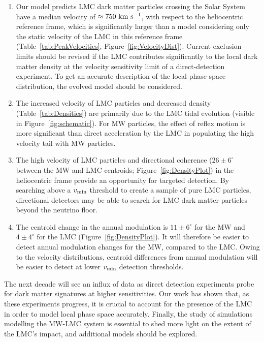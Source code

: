 \documentclass[fleqn,usenatbib]{mnras}
\newcommand{\kms}{{\rm ~km~s^{-1}}}	%
\begin{document}
\begin{enumerate}
    \item Our model predicts LMC dark matter particles crossing the Solar System have a median velocity of $\approx 750 \rm \kms$, with respect to the heliocentric reference frame, which is significantly larger than a model considering only the static velocity of the LMC in this reference frame (Table~\ref{tab:PeakVelocities}, Figure~\ref{fig:VelocityDist}). 
    Current exclusion limits should be revised if the LMC contributes significantly to the local dark matter density at the velocity sensitivity limit of a direct-detection experiment. To get an accurate description of the local phase-space distribution, the evolved model should be considered.
    \item  The increased velocity of LMC particles and decreased density (Table~\ref{tab:Densities}) are primarily due to the LMC tidal evolution (visible in Figure~\ref{fig:schematic}). For MW particles, the effect of reflex motion is more significant than direct acceleration by the LMC in populating the high velocity tail with MW particles. 
    \item The high velocity of LMC particles and directional coherence ($26\pm6 ^\circ$ between the MW and LMC centroids; Figure~\ref{fig:DensityPlot}) in the heliocentric frame provide an opportunity for targeted detection. By searching above a $v_{\rm min}$ threshold to create a sample of pure LMC particles, directional detectors may be able to search for LMC dark matter particles beyond the neutrino floor. 
    \item The centroid change in the annual modulation is $11 \pm 6^{\circ}$ for the MW and $4 \pm 4 ^{\circ}$ for the LMC (Figure~\ref{fig:DensityPlot}). It will therefore be easier to detect annual modulation changes for the MW, compared to the LMC. Owing to the velocity distributions, centroid differences from annual modulation will be easier to detect at lower $v_{\rm min}$ detection thresholds.
\end{enumerate}
The next decade will see an influx of data as direct detection experiments probe for dark matter signatures at higher sensitivities. Our work has shown that, as these experiments progress, it is crucial to account for the presence of the LMC in order to model local phase space accurately. Finally, the study of simulations modelling the MW-LMC system is essential to shed more light on the extent of the LMC's impact, and additional models should be explored.

\vspace{-0.6cm}
\end{document}
